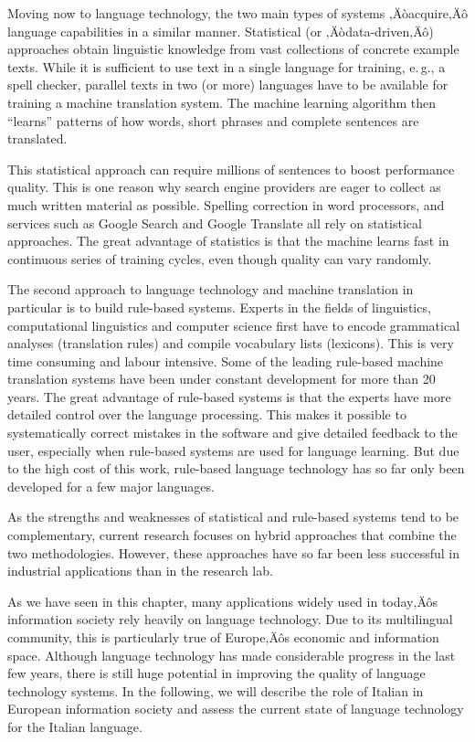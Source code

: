 \begin{multicols}{2}
Moving now to language technology, the two main types of systems ‚Äòacquire‚Äô
language capabilities in a similar manner. Statistical (or ‚Äòdata-driven‚Äô)
approaches obtain linguistic knowledge from vast collections of concrete
example texts. While it is sufficient to use text in a single language for
training, e.\,g., a spell checker, parallel texts in two (or more) languages
have to be available for training a machine translation system. The machine
learning algorithm then “learns” patterns of how words, short phrases and
complete sentences are translated. 

This statistical approach can require millions of sentences to boost
performance quality. This is one reason why
search engine providers are eager to collect as much written material as
possible. Spelling correction in word processors, and services such as Google
Search and Google Translate all rely on statistical approaches. The great
advantage of statistics is that the machine learns fast in continuous series
of training cycles, even though quality can vary randomly.

The second approach to language technology and machine translation in
particular is to build rule-based systems. Experts in the fields of
linguistics, computational linguistics and computer science first have to
encode grammatical analyses (translation rules) and compile vocabulary lists
(lexicons). This is very time consuming and labour intensive. Some of the
leading rule-based machine translation systems have been under constant
development for more than 20 years. The great advantage of rule-based
systems is that the experts have more detailed control over the language
processing. This makes it possible to systematically correct mistakes in the
software and give detailed feedback to the user, especially when rule-based
systems are used for language learning. But due to the high cost of this work,
rule-based language technology has so far only been developed for a few major
languages. 


As the strengths and weaknesses of statistical and rule-based systems tend to
be complementary, current research focuses on hybrid approaches that combine
the two methodologies. However, these approaches have so far been less
successful in industrial applications than in the research lab. 

As we have seen in this chapter, many applications widely used in today‚Äôs
information society rely heavily on language technology. Due to its
multilingual community, this is particularly true of Europe‚Äôs economic and
information space. Although language technology has made considerable progress
in the last few years, there is still huge potential in improving the quality
of language technology systems. In the following, we will describe the role of
Italian in European information society and assess the current state of
language technology for the Italian language.


\end{multicols}

